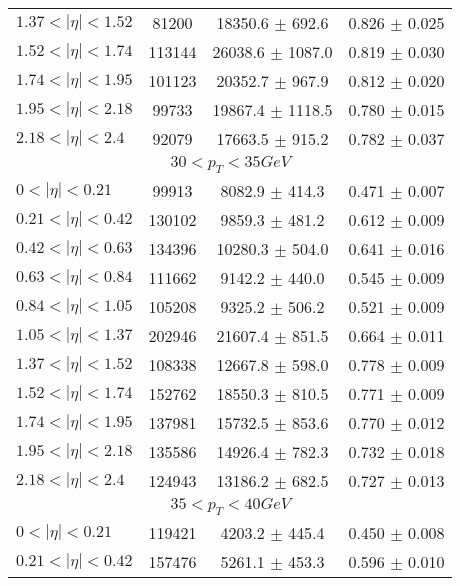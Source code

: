 \begin{tabular}{lccc}
$1.37 < |\eta| <1.52$          & 81200      & 18350.6    $\pm$ 692.6 & 0.826      $\pm$ 0.025 \\
$1.52 < |\eta| <1.74$          & 113144     & 26038.6    $\pm$ 1087.0 & 0.819      $\pm$ 0.030 \\
$1.74 < |\eta| <1.95$          & 101123     & 20352.7    $\pm$ 967.9 & 0.812      $\pm$ 0.020 \\
$1.95 < |\eta| <2.18$          & 99733      & 19867.4    $\pm$ 1118.5 & 0.780      $\pm$ 0.015 \\
$2.18 < |\eta| <2.4$           & 92079      & 17663.5    $\pm$ 915.2 & 0.782      $\pm$ 0.037 \\
\hline
\multicolumn{4}{c}{$30 < p_{T} < 35 GeV$} \\
\hline
$0 < |\eta| <0.21$             & 99913      & 8082.9     $\pm$ 414.3 & 0.471      $\pm$ 0.007 \\
$0.21 < |\eta| <0.42$          & 130102     & 9859.3     $\pm$ 481.2 & 0.612      $\pm$ 0.009 \\
$0.42 < |\eta| <0.63$          & 134396     & 10280.3    $\pm$ 504.0 & 0.641      $\pm$ 0.016 \\
$0.63 < |\eta| <0.84$          & 111662     & 9142.2     $\pm$ 440.0 & 0.545      $\pm$ 0.009 \\
$0.84 < |\eta| <1.05$          & 105208     & 9325.2     $\pm$ 506.2 & 0.521      $\pm$ 0.009 \\
$1.05 < |\eta| <1.37$          & 202946     & 21607.4    $\pm$ 851.5 & 0.664      $\pm$ 0.011 \\
$1.37 < |\eta| <1.52$          & 108338     & 12667.8    $\pm$ 598.0 & 0.778      $\pm$ 0.009 \\
$1.52 < |\eta| <1.74$          & 152762     & 18550.3    $\pm$ 810.5 & 0.771      $\pm$ 0.009 \\
$1.74 < |\eta| <1.95$          & 137981     & 15732.5    $\pm$ 853.6 & 0.770      $\pm$ 0.012 \\
$1.95 < |\eta| <2.18$          & 135586     & 14926.4    $\pm$ 782.3 & 0.732      $\pm$ 0.018 \\
$2.18 < |\eta| <2.4$           & 124943     & 13186.2    $\pm$ 682.5 & 0.727      $\pm$ 0.013 \\
\hline
\multicolumn{4}{c}{$35 < p_{T} < 40 GeV$} \\
\hline
$0 < |\eta| <0.21$             & 119421     & 4203.2     $\pm$ 445.4 & 0.450      $\pm$ 0.008 \\
$0.21 < |\eta| <0.42$          & 157476     & 5261.1     $\pm$ 453.3 & 0.596      $\pm$ 0.010 \\

\end{tabular}
